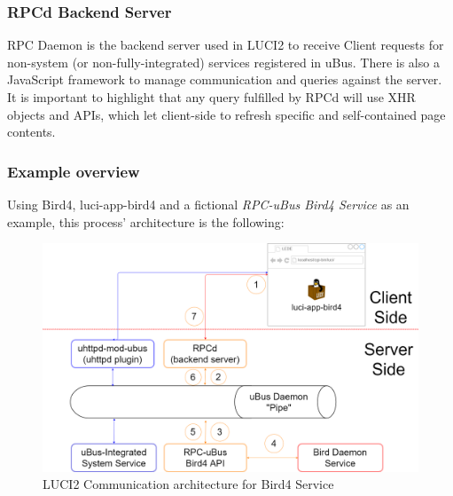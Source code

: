 \subsubsection{RPCd Backend Server}
RPC Daemon is the backend server used in LUCI2 to receive Client requests for non-system (or non-fully-integrated) services registered in uBus. There is also a JavaScript framework to manage communication and queries against the server. It is important to highlight that any query fulfilled by RPCd will use XHR objects and APIs, which let client-side to refresh specific and self-contained page contents.

\subsubsection{Example overview}

Using Bird4, luci-app-bird4 and a fictional \textit{RPC-uBus Bird4 Service} as an example, this process' architecture is the following:

\begin{figure}[H]
    \centering
    \includegraphics[width=\textwidth]{images/luci2/luci2d}
    \caption{LUCI2 Communication architecture for Bird4 Service}
    \label{fig:luci2arch}
\end{figure}

